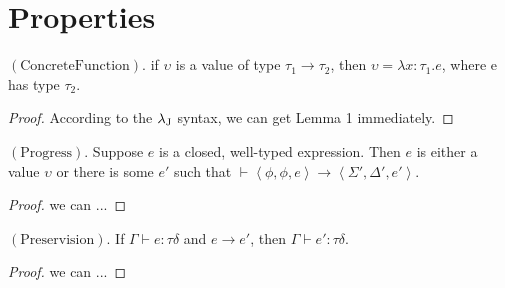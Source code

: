 \section{Properties}
\label{property}

 \begin{lemma}
     $\mathrm{(Concrete Function)}$. if $\upsilon$ is a value of type $\tau_1\rightarrow\tau_2$, then $\upsilon= \lambda x:\tau_1.e$, where e has type $\tau_2$.
    \end{lemma}
 \begin{proof}
     According to the ${\lambda_{\text{J}}}$ syntax, we can get Lemma 1 immediately.
    \end{proof}
 
 \begin{theorem}
     $\mathrm{(Progress).}$ Suppose $e$ is a closed, well-typed expression. Then $e$ is either a value $\upsilon$ or there is some $e'$ such that $\vdash\left\langle\phi ,\phi ,e\right\rangle\rightarrow\left\langle\Sigma',\Delta',e'\right\rangle$.
 \end{theorem}   
    \begin{proof}
        we can ...
    \end{proof}
    
    \begin{theorem}
        $\mathrm{(Preservision).}$ If $\Gamma\vdash e:\tau\delta$ and $e\rightarrow e'$, then $\Gamma\vdash e':\tau\delta$. 
    \end{theorem}
    \begin{proof}
        we can ...
    \end{proof}